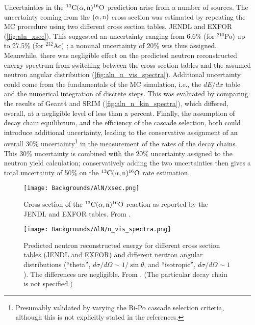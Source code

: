 \documentclass[../thesis.tex]{subfiles}
\begin{document}
Uncertainties in the $^{13}\mathrm{C}(\alpha, \mathrm{n})^{16}\mathrm{O}$ prediction arise from a number of sources. The uncertainty coming from the $(\alpha,\mathrm{n})$ cross section was estimated by repeating the MC procedure using two different cross section tables, JENDL \cite{jendl} and EXFOR \cite{exfor} (\autoref{fig:aln_xsec}). This suggested an uncertainty ranging from 6.6\% (for $^{210}$Po) up to 27.5\% (for $^{232}$Ac) \cite{Zhao_2014}; a nominal uncertainty of 20\% was thus assigned. Meanwhile, there was negligible effect on the predicted neutron reconstructed energy spectrum from switching between the cross section tables and the assumed neutron angular distribution (\autoref{fig:aln_n_vis_spectra}). Additional uncertainty could come from the fundamentals of the MC simulation, i.e., the $dE/dx$ table and the numerical integration of discrete steps. This was evaluated by comparing the results of Geant4 \cite{Geant4} and SRIM \cite{SRIM} (\autoref{fig:aln_n_kin_spectra}), which differed, overall, at a negligible level of less than a percent. Finally, the assumption of decay chain equilibrium, and the efficiency of the cascade selection, both could introduce additional uncertainty, leading to the conservative assignment of an overall 30\% uncertainty\footnote{Presumably validated by varying the Bi-Po cascade selection criteria, although this is not explicitly stated in the references.} in the measurement of the rates of the decay chains. This 30\% uncertainty is combined with the 20\% uncertainty assigned to the neutron yield calculation; conservatively adding the two uncertainties then gives a total uncertainty of 50\% on the $^{13}\mathrm{C}(\alpha, \mathrm{n})^{16}\mathrm{O}$ rate estimation.

\begin{figure}[ht]
  \texttt{[image: Backgrounds/AlN/xsec.png]}
  \caption{Cross section of the $^{13}\mathrm{C}(\alpha, \mathrm{n})^{16}\mathrm{O}$ reaction as reported by the JENDL and EXFOR tables. From \cite{Zhao_2014}.}
  \label{fig:aln_xsec}
\end{figure}

\begin{figure}[ht]
  \texttt{[image: Backgrounds/AlN/n\_vis\_spectra.png]}
  \caption{Predicted neutron reconstructed energy for different cross section tables (JENDL and EXFOR) and different neutron angular distributions (``theta'', $d\sigma/d\Omega \sim 1/\sin\theta$, and ``isotropic'', $d\sigma/d\Omega \sim 1$). The differences are negligible. From \cite{Zhao_2014}. (The particular decay chain is not specified.)}
  \label{fig:aln_n_vis_spectra}
\end{figure}
\end{document}
